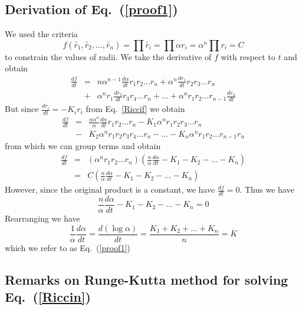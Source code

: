 \documentclass[12pt]{article}
\begin{document}
  \subsection*{Derivation of Eq.~(\ref{proof1})}
	\maketitle
	
	We used the criteria $$f(\tilde{r_1},\tilde{r_2},\ldots,\tilde{r_n}) = \prod{\tilde{r_i}} = \prod{\alpha r_i} = \alpha^n\prod{r_i}= C$$ to constrain the values of radii. We take the derivative of $f$ with respect to $t$ and obtain
	\begin{eqnarray*}
	\frac{df}{dt} & = & n\alpha^{n-1}\frac{d\alpha}{dt}r_1r_2\ldots r_n + \alpha^n\frac{dr_1}{dt}r_2r_3\ldots r_n\\
								& + & \alpha^nr_1\frac{dr_2}{dt}r_3r_4\ldots r_n + \ldots + \alpha^nr_1r_2\ldots r_{n-1}\frac{dr_n}{dt}
	\end{eqnarray*}
	But since $\displaystyle \frac{dr_i}{dt} = -K_ir_i$ from Eq.~\ref{Riccif} we obtain
	\begin{eqnarray*}
	\frac{df}{dt} & = & \frac{n\alpha^{n}}{\alpha}\frac{d\alpha}{dt}r_1r_2\ldots r_n - K_1\alpha^nr_1r_2r_3\ldots r_n\\
								& - & K_2\alpha^nr_1r_2r_3r_4\ldots r_n - \ldots - K_n\alpha^nr_1r_2\ldots r_{n-1}r_n
	\end{eqnarray*}
	from which we can group terms and obtain
	\begin{eqnarray*}
	\frac{df}{dt} & = & (\alpha^nr_1r_2\ldots r_n)(\frac{n}{\alpha}\frac{d\alpha}{dt} - K_1 - K_2 - \ldots - K_n)\\
								& = & C(\frac{n}{\alpha}\frac{d\alpha}{dt} - K_1 - K_2 - \ldots - K_n)
	\end{eqnarray*}
	However, since the original product is a constant, we have $\displaystyle \frac{df}{dt} = 0.$ Thus we have $$\frac{n}{\alpha}\frac{d\alpha}{dt} - K_1 - K_2 - \ldots - K_n = 0$$
	Rearranging we have
$$\frac{1}{\alpha}\frac{d\alpha}{dt} = \frac{d(\log \alpha)}{dt} = \frac{K_1 + K_2 + \ldots + K_n}{n} = \overline{K}$$
	which we refer to as Eq.~(\ref{proof1})
  
  \subsection*{Remarks on Runge-Kutta method for solving Eq.~(\ref{Riccin})}
	\maketitle
\end{document}
